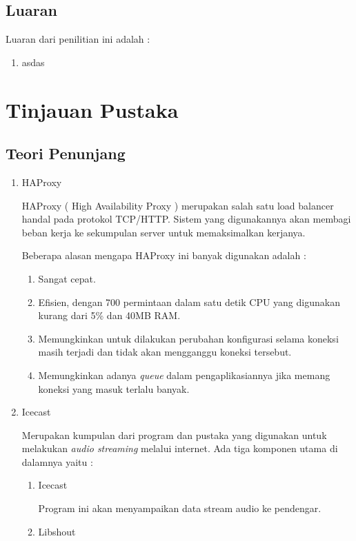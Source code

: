 \documentclass[oneside]{book}
\begin{document}
	\section{Luaran}
	Luaran dari penilitian ini adalah :
	\begin{enumerate}
		\item asdas
	\end{enumerate}
	

	\chapter{Tinjauan Pustaka}
	\section{Teori Penunjang}
	\begin{enumerate}
		\item HAProxy
		
		HAProxy ( High Availability Proxy ) merupakan salah satu load balancer handal pada protokol TCP/HTTP. Sistem yang digunakannya akan membagi beban kerja ke sekumpulan server untuk memaksimalkan kerjanya.
		
		Beberapa alasan mengapa HAProxy ini banyak digunakan adalah :
		\begin{enumerate}
			\item Sangat cepat.
			\item Efisien, dengan 700 permintaan dalam satu detik CPU yang digunakan kurang dari 5\% dan 40MB RAM.
			\item Memungkinkan untuk dilakukan perubahan konfigurasi selama koneksi masih terjadi dan tidak akan mengganggu koneksi tersebut.
			\item Memungkinkan adanya \textit{queue} dalam pengaplikasiannya jika memang koneksi yang masuk terlalu banyak.
		\end{enumerate}
		
		
		\item Icecast
		
		Merupakan kumpulan dari program dan pustaka yang digunakan untuk melakukan \textit{audio streaming} melalui internet. Ada tiga komponen utama di dalamnya yaitu :
		
		\begin{enumerate}
			\item Icecast
			
			Program ini akan menyampaikan data stream audio ke pendengar.
			
			\item Libshout
			

\end{enumerate}
\end{enumerate}
\end{document}
